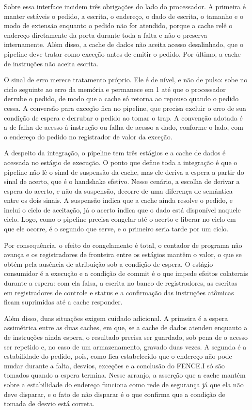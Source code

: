 Sobre essa interface incidem três obrigações do lado do processador. A primeira é manter estáveis o pedido, a escrita, o endereço, o dado de escrita, o tamanho e o modo de extensão enquanto o pedido não for atendido, porque a cache relê o endereço diretamente da porta durante toda a falta e não o preserva internamente. Além disso, a cache de dados não aceita acesso desalinhado, que o pipeline deve tratar como exceção antes de emitir o pedido. Por último, a cache de instruções não aceita escrita.

O sinal de erro merece tratamento próprio. Ele é de nível, e não de pulso: sobe no ciclo seguinte ao erro da memória e permanece em 1 até que o processador derrube o pedido, de modo que a cache só retorna ao repouso quando o pedido cessa. A conversão para exceção fica no pipeline, que precisa excluir o erro de sua condição de espera e derrubar o pedido ao tomar o trap. A convenção adotada é a de falha de acesso à instrução ou falha de acesso a dado, conforme o lado, com o endereço do pedido no registrador de valor da exceção.

A despeito da integração, o pipeline tem três estágios e a cache de dados é acessada no estágio de execução. O ponto que define toda a integração é que o pipeline não lê o sinal de suspensão da cache, mas ele deriva a espera a partir do sinal de acerto, que é o handshake efetivo. Nesse cenário, a escolha de derivar a espera do acerto, e não da suspensão, decorre de uma diferença de semântica entre os dois sinais. A suspensão indica que a cache ainda resolve o pedido, e inclui o ciclo de aceitação, já o acerto indica que o dado está disponível naquele ciclo. Logo, como o pipeline precisa congelar até o acerto e liberar no ciclo em que ele ocorre, é o segundo que serve, e o primeiro seria tarde por um ciclo.

Por consequência, o efeito do congelamento é total, o contador de programa não avança e os registradores de fronteira entre os estágios mantêm o valor, o que se obtém pela ausência de atribuição sob a condição de espera. O estágio consumidor é a execução e a condição de commit é o que impede efeitos colaterais durante a espera: com ela falsa, a escrita no banco de registradores, as escritas em registradores de controle e status e a confirmação das instruções atômicas ficam suprimidas até a cache responder.

Além disso, duas situações exigem cuidado adicional. A primeira é a espera assimétrica entre as duas caches, em que, se a cache de dados atendeu enquanto a de instruções ainda espera, o resultado precisa ser guardado, sob pena de o acesso ser repetido e, no caso de um armazenamento, gravado duas vezes. A segunda é a estabilidade do pedido, pois, como fica estabelecido que o endereço não pode mudar durante a falta, desvios, exceções e a conclusão do FENCE.I só são tomados quando a espera termina. Nesse arranjo, a asserção que a cache mantém sobre a estabilidade do endereço funciona como rede de segurança já que ela não deve disparar, e o fato de não disparar é o que confirma que a condição de tomada de desvio está correta.

